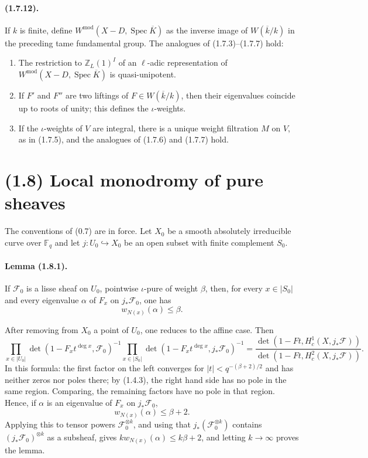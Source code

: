 \documentclass[11pt]{article}
\theoremstyle{remark}
\newcommand{\Fq}{\mathbb{F}_q}
\newcommand{\Spec}{\operatorname{Spec}}
\begin{document}
\paragraph{(1.7.12).} If $k$ is finite, define $W^{\mathrm{mod}}(X-D,\Spec\overline K)$ as the inverse image of $W(\overline k/k)$ in the preceding tame fundamental group. The analogues of (1.7.3)--(1.7.7) hold:
\begin{enumerate}[label=(1.7.12.\arabic*)]
\item The restriction to $\mathbb Z_L(1)^I$ of an $\ell$-adic representation of $W^{\mathrm{mod}}(X-D,\Spec\overline K)$ is quasi-unipotent.
\item If $F'$ and $F''$ are two liftings of $F\in W(\overline k/k)$, then their eigenvalues coincide up to roots of unity; this defines the $\iota$-weights.
\item If the $\iota$-weights of $V$ are integral, there is a unique weight filtration $M$ on $V$, as in (1.7.5), and the analogues of (1.7.6) and (1.7.7) hold.
\end{enumerate}

\section*{(1.8) Local monodromy of pure sheaves}

The conventions of (0.7) are in force. Let $X_0$ be a smooth absolutely irreducible curve over $\Fq$ and let $j:U_0\hookrightarrow X_0$ be an open subset with finite complement $S_0$.

\paragraph{Lemma (1.8.1).} If $\mathcal F_0$ is a lisse sheaf on $U_0$, pointwise $\iota$-pure of weight $\beta$, then, for every $x\in |S_0|$ and every eigenvalue $\alpha$ of $F_x$ on $j_*\mathcal F_0$, one has
\[
        w_{N(x)}(\alpha)\le \beta.
\]

After removing from $X_0$ a point of $U_0$, one reduces to the affine case. Then
\begin{equation}\tag{1.8.1.1}
\prod_{x\in |U_0|}\det(1-F_xt^{\deg x},\mathcal F_0)^{-1}
\prod_{x\in |S_0|}\det(1-F_xt^{\deg x},j_*\mathcal F_0)^{-1}
=
\frac{\det(1-Ft,H^1_c(X,j_*\mathcal F))}
{\det(1-Ft,H^2_c(X,j_*\mathcal F))}.
\end{equation}
In this formula: the first factor on the left converges for $|t|<q^{-(\beta+2)/2}$ and has neither zeros nor poles there; by (1.4.3), the right hand side has no pole in the same region. Comparing, the remaining factors have no pole in that region. Hence, if $\alpha$ is an eigenvalue of $F_x$ on $j_*\mathcal F_0$,
\begin{equation}\tag{1.8.1.2}
        w_{N(x)}(\alpha)\le \beta+2.
\end{equation}
Applying this to tensor powers $\mathcal F_0^{\otimes k}$, and using that $j_*(\mathcal F_0^{\otimes k})$ contains $(j_*\mathcal F_0)^{\otimes k}$ as a subsheaf, gives $kw_{N(x)}(\alpha)\le k\beta+2$, and letting $k\to\infty$ proves the lemma.
\end{document}
